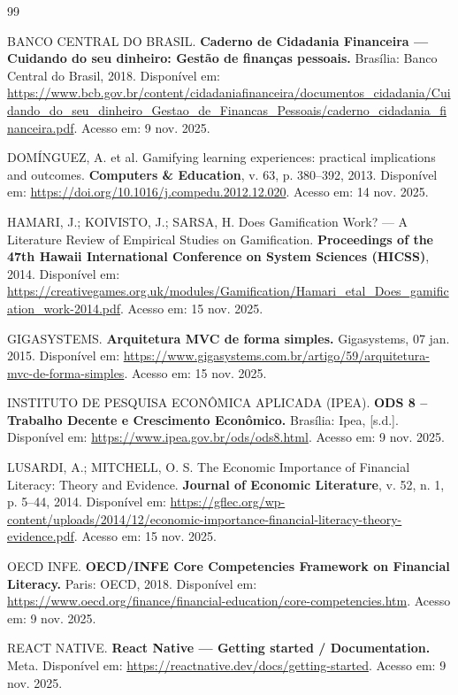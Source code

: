 \documentclass[12pt,a4paper]{article}
\begin{document}
\begin{thebibliography}{99}

BANCO CENTRAL DO BRASIL. \textbf{Caderno de Cidadania Financeira — Cuidando do seu dinheiro: Gestão de finanças pessoais.} Brasília: Banco Central do Brasil, 2018. Disponível em: \url{https://www.bcb.gov.br/content/cidadaniafinanceira/documentos_cidadania/Cuidando_do_seu_dinheiro_Gestao_de_Financas_Pessoais/caderno_cidadania_financeira.pdf}. Acesso em: 9 nov. 2025.

DOMÍNGUEZ, A. et al. Gamifying learning experiences: practical implications and outcomes. \textbf{Computers \& Education}, v. 63, p. 380–392, 2013. Disponível em: \url{https://doi.org/10.1016/j.compedu.2012.12.020}. Acesso em: 14 nov. 2025.

HAMARI, J.; KOIVISTO, J.; SARSA, H. Does Gamification Work? — A Literature Review of Empirical Studies on Gamification. \textbf{Proceedings of the 47th Hawaii International Conference on System Sciences (HICSS)}, 2014. Disponível em: \url{https://creativegames.org.uk/modules/Gamification/Hamari_etal_Does_gamification_work-2014.pdf}. Acesso em: 15 nov. 2025.

GIGASYSTEMS. \textbf{Arquitetura MVC de forma simples.} Gigasystems, 07 jan. 2015. Disponível em: \url{https://www.gigasystems.com.br/artigo/59/arquitetura-mvc-de-forma-simples}. Acesso em: 15 nov. 2025.

INSTITUTO DE PESQUISA ECONÔMICA APLICADA (IPEA). \textbf{ODS 8 – Trabalho Decente e Crescimento Econômico.} Brasília: Ipea, [s.d.]. Disponível em: \url{https://www.ipea.gov.br/ods/ods8.html}. Acesso em: 9 nov. 2025.

LUSARDI, A.; MITCHELL, O. S. The Economic Importance of Financial Literacy: Theory and Evidence. \textbf{Journal of Economic Literature}, v. 52, n. 1, p. 5–44, 2014. Disponível em: \url{https://gflec.org/wp-content/uploads/2014/12/economic-importance-financial-literacy-theory-evidence.pdf}. Acesso em: 15 nov. 2025.

OECD INFE. \textbf{OECD/INFE Core Competencies Framework on Financial Literacy.} Paris: OECD, 2018. Disponível em: \url{https://www.oecd.org/finance/financial-education/core-competencies.htm}. Acesso em: 9 nov. 2025.

REACT NATIVE. \textbf{React Native — Getting started / Documentation.} Meta. Disponível em: \url{https://reactnative.dev/docs/getting-started}. Acesso em: 9 nov. 2025.

\end{thebibliography}
\end{document}
